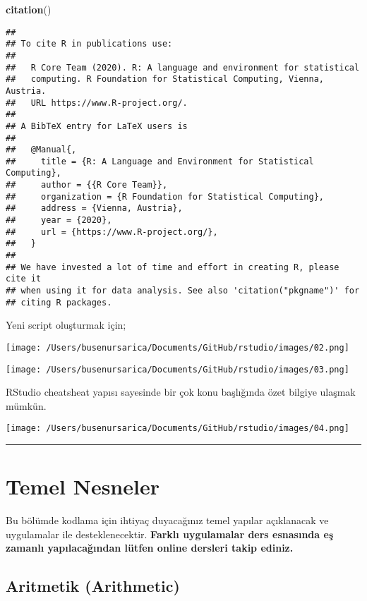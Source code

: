 \documentclass[
]{book}
\newenvironment{Shaded}{\begin{snugshade}}{\end{snugshade}}
\newcommand{\KeywordTok}[1]{\textcolor[rgb]{0.13,0.29,0.53}{\textbf{#1}}}
\newcommand{\NormalTok}[1]{#1}
\begin{document}
\begin{Shaded}
\begin{Highlighting}[]
\KeywordTok{citation}\NormalTok{()}
\end{Highlighting}
\end{Shaded}

\begin{verbatim}
##
## To cite R in publications use:
##
##   R Core Team (2020). R: A language and environment for statistical
##   computing. R Foundation for Statistical Computing, Vienna, Austria.
##   URL https://www.R-project.org/.
##
## A BibTeX entry for LaTeX users is
##
##   @Manual{,
##     title = {R: A Language and Environment for Statistical Computing},
##     author = {{R Core Team}},
##     organization = {R Foundation for Statistical Computing},
##     address = {Vienna, Austria},
##     year = {2020},
##     url = {https://www.R-project.org/},
##   }
##
## We have invested a lot of time and effort in creating R, please cite it
## when using it for data analysis. See also 'citation("pkgname")' for
## citing R packages.
\end{verbatim}

Yeni script oluşturmak için;

\texttt{[image: /Users/busenursarica/Documents/GitHub/rstudio/images/02.png]}

\texttt{[image: /Users/busenursarica/Documents/GitHub/rstudio/images/03.png]}

RStudio cheatsheat yapısı sayesinde bir çok konu başlığında özet bilgiye ulaşmak mümkün.

\texttt{[image: /Users/busenursarica/Documents/GitHub/rstudio/images/04.png]}

\begin{center}\rule{0.5\linewidth}{0.5pt}\end{center}

\hypertarget{temel-nesneler}{%
\chapter{Temel Nesneler}\label{temel-nesneler}}

Bu bölümde kodlama için ihtiyaç duyacağınız temel yapılar açıklanacak ve uygulamalar ile desteklenecektir. \textbf{Farklı uygulamalar ders esnasında eş zamanlı yapılacağından lütfen online dersleri takip ediniz.}

\hypertarget{aritmetik-arithmetic}{%
\section{Aritmetik (Arithmetic)}\label{aritmetik-arithmetic}}
\end{document}
